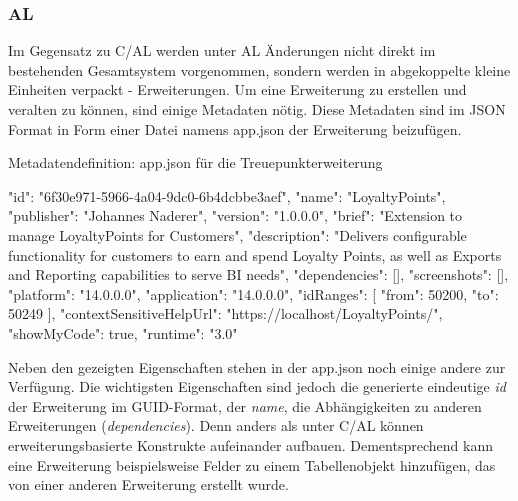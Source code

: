 \pagebreak
\subsubsection{AL}

Im Gegensatz zu C/AL werden unter AL Änderungen nicht direkt im bestehenden Gesamtsystem vorgenommen, sondern werden in abgekoppelte kleine Einheiten verpackt - Erweiterungen. Um eine Erweiterung zu erstellen und veralten zu können, sind einige Metadaten nötig. Diese Metadaten sind im JSON Format in Form einer Datei namens app.json der Erweiterung beizufügen. 

\begin{program}[H]  %
	\centering
	\caption{Metadatendefinition: app.json für die Treuepunkterweiterung}
	\label{prog:PointEntryValidation}
	\begin{JavaCode}
{
	"id": "6f30e971-5966-4a04-9dc0-6b4dcbbe3aef",
	"name": "LoyaltyPoints",
	"publisher": "Johannes Naderer",
	"version": "1.0.0.0",
	"brief": "Extension to manage LoyaltyPoints for Customers",
	"description": "Delivers configurable functionality for customers to earn and spend Loyalty Points, as well as Exports and Reporting capabilities to serve BI needs",
	"dependencies": [],
	"screenshots": [],
	"platform": "14.0.0.0",
	"application": "14.0.0.0",
	"idRanges": [
	{
		"from": 50200,
		"to": 50249
	}
	],
	"contextSensitiveHelpUrl": "https://localhost/LoyaltyPoints/",
	"showMyCode": true,
	"runtime": "3.0"
}
	\end{JavaCode}
\end{program}

Neben den gezeigten Eigenschaften stehen in der app.json noch einige andere zur Verfügung. Die wichtigsten Eigenschaften sind jedoch die generierte eindeutige \textit{id} der Erweiterung im GUID-Format, der \textit{name}, die Abhängigkeiten zu anderen Erweiterungen (\textit{dependencies}). Denn anders als unter C/AL können erweiterungsbasierte Konstrukte aufeinander aufbauen. Dementsprechend kann eine Erweiterung beispielsweise Felder zu einem Tabellenobjekt hinzufügen, das von einer anderen Erweiterung erstellt wurde.
\linebreak

